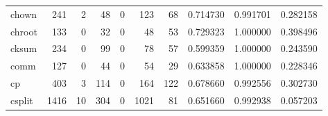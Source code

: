 \begin{tabular}{lrrrrrrrrr}
chown     &                                                241 &                                                  2 &                                                 48 &                                                  0 &                                                123 &                                                 68 &                                           0.714730 &                               0.991701 &                             0.282158 \\
chroot    &                                                133 &                                                  0 &                                                 32 &                                                  0 &                                                 48 &                                                 53 &                                           0.729323 &                               1.000000 &                             0.398496 \\
cksum     &                                                234 &                                                  0 &                                                 99 &                                                  0 &                                                 78 &                                                 57 &                                           0.599359 &                               1.000000 &                             0.243590 \\
comm      &                                                127 &                                                  0 &                                                 44 &                                                  0 &                                                 54 &                                                 29 &                                           0.633858 &                               1.000000 &                             0.228346 \\
cp        &                                                403 &                                                  3 &                                                114 &                                                  0 &                                                164 &                                                122 &                                           0.678660 &                               0.992556 &                             0.302730 \\
csplit    &                                               1416 &                                                 10 &                                                304 &                                                  0 &                                               1021 &                                                 81 &                                           0.651660 &                               0.992938 &                             0.057203 \\

\end{tabular}
